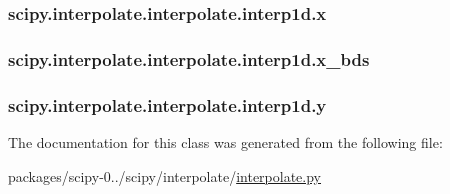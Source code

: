 \subsubsection[{x}]{\setlength{\rightskip}{0pt plus 5cm}scipy.\+interpolate.\+interpolate.\+interp1d.\+x}\label{classscipy_1_1interpolate_1_1interpolate_1_1interp1d_a6dece428e3c7689e5734d674c51bc9e8}
\hypertarget{classscipy_1_1interpolate_1_1interpolate_1_1interp1d_afd6b75c3bcd0b72c86e60ca8fd905183}{}
\subsubsection[{x\+\_\+bds}]{\setlength{\rightskip}{0pt plus 5cm}scipy.\+interpolate.\+interpolate.\+interp1d.\+x\+\_\+bds}\label{classscipy_1_1interpolate_1_1interpolate_1_1interp1d_afd6b75c3bcd0b72c86e60ca8fd905183}
\hypertarget{classscipy_1_1interpolate_1_1interpolate_1_1interp1d_a3c7198a95c4626dcb5184baa37954888}{}
\subsubsection[{y}]{\setlength{\rightskip}{0pt plus 5cm}scipy.\+interpolate.\+interpolate.\+interp1d.\+y}\label{classscipy_1_1interpolate_1_1interpolate_1_1interp1d_a3c7198a95c4626dcb5184baa37954888}


The documentation for this class was generated from the following file\+:\begin{DoxyCompactItemize}
\item 
packages/scipy-\/0../scipy/interpolate/\hyperlink{interpolate_8py}{interpolate.\+py}\end{DoxyCompactItemize}
